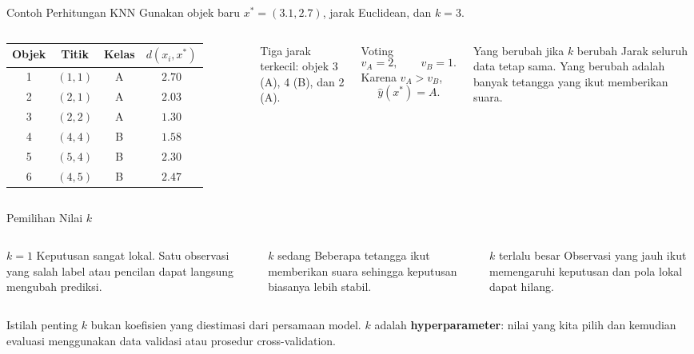 \documentclass[aspectratio=169,11pt]{beamer}
\begin{document}
\begin{frame}{Contoh Perhitungan KNN}
\small
Gunakan objek baru $x^*=(3.1,2.7)$, jarak Euclidean, dan $k=3$.
\begin{columns}[T]
\centering
\begin{tabular}{c c c c}
\toprule
Objek & Titik & Kelas & $d(x_i,x^*)$ \\
\midrule
1 & $(1,1)$ & A & $2.70$ \\
2 & $(2,1)$ & A & $2.03$ \\
3 & $(2,2)$ & A & $1.30$ \\
4 & $(4,4)$ & B & $1.58$ \\
5 & $(5,4)$ & B & $2.30$ \\
6 & $(4,5)$ & B & $2.47$ \\
\bottomrule
\end{tabular}
\vspace{2mm}
Tiga jarak terkecil: objek 3 (A), 4 (B), dan 2 (A).
\begin{block}{Voting}
\[
v_A=2,\qquad v_B=1.
\]
Karena $v_A>v_B$,
\[
\boxed{\hat y(x^*)=A}.
\]
\end{block}
\begin{alertblock}{Yang berubah jika $k$ berubah}
\footnotesize
Jarak seluruh data tetap sama. Yang berubah adalah banyak tetangga yang ikut memberikan suara.
\end{alertblock}
\end{columns}
\end{frame}

\begin{frame}{Pemilihan Nilai \texorpdfstring{$k$}{k}}
\begin{columns}[T]
\begin{block}{$k=1$}
\small
Keputusan sangat lokal. Satu observasi yang salah label atau pencilan dapat langsung mengubah prediksi.
\end{block}
\begin{block}{$k$ sedang}
\small
Beberapa tetangga ikut memberikan suara sehingga keputusan biasanya lebih stabil.
\end{block}
\begin{block}{$k$ terlalu besar}
\small
Observasi yang jauh ikut memengaruhi keputusan dan pola lokal dapat hilang.
\end{block}
\end{columns}
\vspace{2mm}
\begin{alertblock}{Istilah penting}
\small
$k$ bukan koefisien yang diestimasi dari persamaan model. $k$ adalah \textbf{hyperparameter}: nilai yang kita pilih dan kemudian evaluasi menggunakan data validasi atau prosedur cross-validation.
\end{alertblock}
\end{frame}
\end{document}
